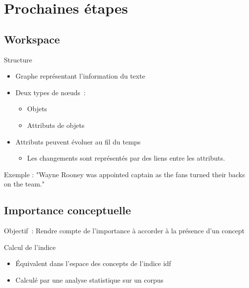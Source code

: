 \documentclass{beamer}
\begin{document}
\section{Prochaines étapes}

\subsection{Workspace}
\begin{frame}
  \begin{block}{Structure}
  \begin{itemize}
    \item Graphe représentant l'information du texte
    \item Deux types de nœuds~:
      \begin{itemize}
        \item Objets
        \item Attributs de objets
      \end{itemize}
    \item Attributs peuvent évoluer au fil du temps
    \begin{itemize}
    	\item Les changements sont représentés par des liens entre les attributs.
    \end{itemize}
  \end{itemize}
  
  Exemple : "Wayne Rooney was appointed captain as the fans turned their backs on the team."
  \end{block}
\end{frame}

\subsection{Importance conceptuelle}
\begin{frame}
  \begin{block}{Objectif~:}
    Rendre compte de l'importance à accorder à la présence d'un concept
  \end{block}

  \begin{block}{Calcul de l'indice}
    \begin{itemize}
      \item Équivalent dans l'espace des concepts de l'indice idf
      \item Calculé par une analyse statistique sur un corpus
    \end{itemize}
  \end{block}
\end{frame}
\end{document}
